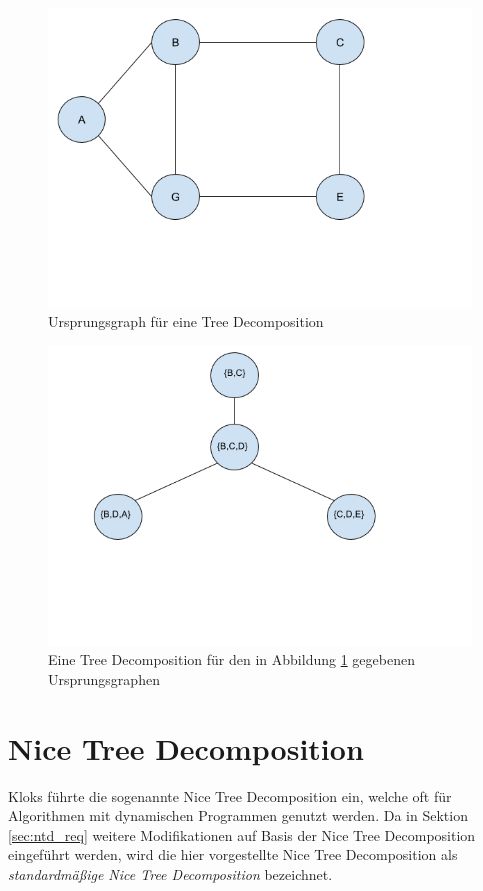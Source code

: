 \begin{figure}
\label{fig:td_1}
  \centering
    \includegraphics[width=1.0\textwidth]{./imgs/TD_1.png}
  	\caption{Ursprungsgraph für eine Tree Decomposition}
\end{figure}

\begin{figure}
\label{fig:td_2}
  \centering
    \includegraphics[width=1.0\textwidth]{./imgs/TD_2.png}
  	\caption{Eine Tree Decomposition für den in Abbildung \ref{fig:td_1} gegebenen Ursprungsgraphen}
\end{figure}

\section{Nice Tree Decomposition}
\label{sec:ntd_ntd}
Kloks\cite{kloks1994} führte die sogenannte Nice Tree Decomposition ein, welche oft für Algorithmen mit dynamischen Programmen genutzt werden. Da in Sektion \ref{sec:ntd_req} weitere Modifikationen auf Basis der Nice Tree Decomposition eingeführt werden, wird die hier vorgestellte Nice Tree Decomposition als \textit{standardmäßige Nice Tree Decomposition} bezeichnet.

